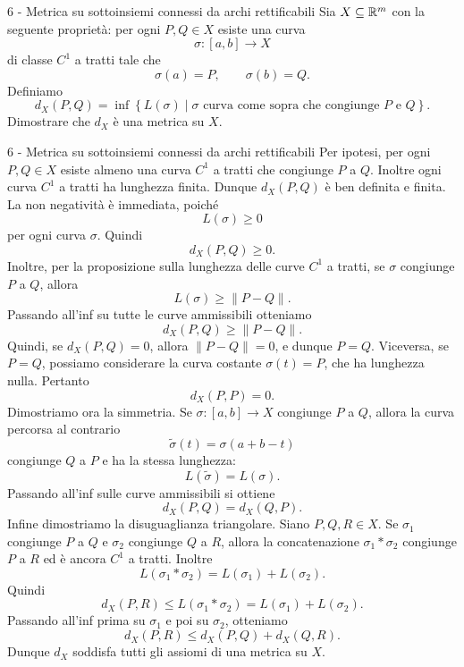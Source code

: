 \documentclass[a4paper]{article}
\begin{document}
\begin{snippetexercise}{6 - Metrica su sottoinsiemi connessi da archi rettificabili}
    Sia \(X\subseteq\mathbb{R}^m\) con la seguente proprietà: per
    ogni \(P,Q\in X\) esiste una curva
    \[
        \sigma\colon[a,b]\to X
    \]
    di classe \(C^1\) a tratti tale che
    \[
        \sigma(a)=P,
        \qquad
        \sigma(b)=Q.
    \]
    Definiamo
    \[
        d_X(P,Q)=\inf\left\{L(\sigma)\mid \sigma \text{ curva come sopra
        che congiunge } P \text{ e } Q\right\}.
    \]
    Dimostrare che \(d_X\) è una metrica su \(X\).
\end{snippetexercise}

\begin{snippetsolution}{6 - Metrica su sottoinsiemi connessi da archi rettificabili}
    Per ipotesi, per ogni \(P,Q\in X\) esiste almeno una curva \(C^1\) a tratti che congiunge \(P\) a \(Q\). Inoltre ogni curva \(C^1\) a tratti ha lunghezza finita. Dunque \(d_X(P,Q)\) è ben definita e finita.
    La non negatività è immediata, poiché
    \[
        L(\sigma)\geq 0
    \]
    per ogni curva \(\sigma\). Quindi
    \[
        d_X(P,Q)\geq 0.
    \]
    Inoltre, per la proposizione sulla lunghezza delle curve \(C^1\) a tratti, se \(\sigma\) congiunge \(P\) a \(Q\), allora
    \[
        L(\sigma)\geq \left\|P-Q\right\|.
    \]
    Passando all'inf su tutte le curve ammissibili otteniamo
    \[
        d_X(P,Q)\geq \left\|P-Q\right\|.
    \]
    Quindi, se \(d_X(P,Q)=0\), allora \(\left\|P-Q\right\|=0\), e dunque \(P=Q\). Viceversa, se \(P=Q\), possiamo considerare la curva costante \(\sigma(t)=P\), che ha lunghezza nulla. Pertanto
    \[
        d_X(P,P)=0.
    \]
    Dimostriamo ora la simmetria. Se \(\sigma\colon[a,b]\to X\) congiunge \(P\) a \(Q\), allora la curva percorsa al contrario
    \[
        \widetilde{\sigma}(t)=\sigma(a+b-t)
    \]
    congiunge \(Q\) a \(P\) e ha la stessa lunghezza:
    \[
        L(\widetilde{\sigma})=L(\sigma).
    \]
    Passando all'inf sulle curve ammissibili si ottiene
    \[
        d_X(P,Q)=d_X(Q,P).
    \]
    Infine dimostriamo la disuguaglianza triangolare. Siano \(P,Q,R\in X\). Se \(\sigma_1\) congiunge \(P\) a \(Q\) e \(\sigma_2\) congiunge \(Q\) a \(R\), allora la concatenazione \(\sigma_1*\sigma_2\) congiunge \(P\) a \(R\) ed è ancora \(C^1\) a tratti. Inoltre
    \[
        L(\sigma_1*\sigma_2)=L(\sigma_1)+L(\sigma_2).
    \]
    Quindi
    \[
        d_X(P,R)\leq L(\sigma_1*\sigma_2)=L(\sigma_1)+L(\sigma_2).
    \]
    Passando all'inf prima su \(\sigma_1\) e poi su \(\sigma_2\), otteniamo
    \[
        d_X(P,R)\leq d_X(P,Q)+d_X(Q,R).
    \]
    Dunque \(d_X\) soddisfa tutti gli assiomi di una metrica su \(X\).
\end{snippetsolution}
\end{document}
